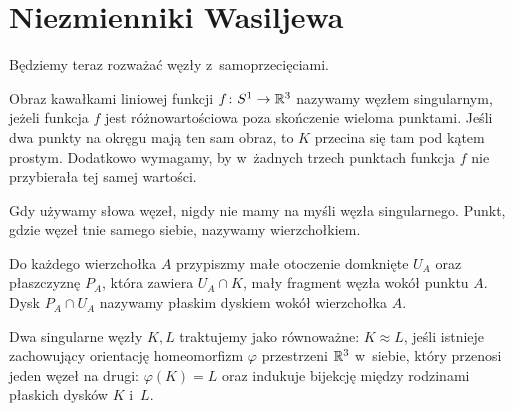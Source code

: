 \section{Niezmienniki Wasiljewa} %
\label{sec:vassiliev}
Będziemy teraz rozważać węzły z~samoprzecięciami.

\begin{definition}
    Obraz kawałkami liniowej funkcji $f \colon S^1 \to \mathbb R^3$ nazywamy węzłem singularnym, jeżeli funkcja $f$ jest różnowartościowa poza skończenie wieloma punktami.
    Jeśli dwa punkty na okręgu mają ten sam obraz, to $K$ przecina się tam pod kątem prostym.
    Dodatkowo wymagamy, by w~żadnych trzech punktach funkcja $f$ nie przybierała tej samej wartości.
\end{definition}

Gdy używamy słowa węzeł, nigdy nie mamy na myśli węzła singularnego.
Punkt, gdzie węzeł tnie samego siebie, nazywamy wierzchołkiem.

Do każdego wierzchołka $A$ przypiszmy małe otoczenie domknięte $U_A$ oraz płaszczyznę $P_A$, która zawiera $U_A \cap K$, mały fragment węzła wokół punktu $A$. Dysk $P_A \cap U_A$ nazywamy płaskim dyskiem wokół wierzchołka $A$.

\begin{definition}
    Dwa singularne węzły $K, L$ traktujemy jako równoważne: $K \approx L$, jeśli istnieje zachowujący orientację homeomorfizm $\varphi$ przestrzeni $\mathbb R^3$ w~siebie, który przenosi jeden węzeł na drugi: $\varphi(K) = L$ oraz indukuje bijekcję między rodzinami płaskich dysków $K$ i~$L$.
\end{definition}

